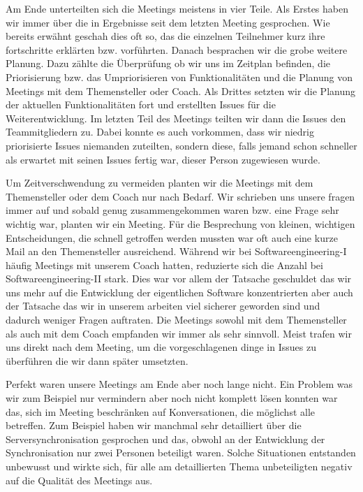 \documentclass[10pt]{article}
\begin{document}
Am Ende unterteilten sich die Meetings meistens in vier Teile. Als Erstes haben wir immer über die in Ergebnisse
seit dem letzten Meeting gesprochen. Wie bereits erwähnt geschah dies oft so, das die einzelnen Teilnehmer 
kurz ihre fortschritte erklärten bzw. vorführten.  Danach besprachen wir die grobe weitere Planung. Dazu zählte die 
Überprüfung ob wir uns im Zeitplan befinden, die Priorisierung bzw. das Umpriorisieren von Funktionalitäten und die 
Planung von Meetings mit dem Themensteller oder Coach. Als Drittes setzten wir die Planung der aktuellen Funktionalitäten 
fort und erstellten Issues für die Weiterentwicklung. Im letzten Teil des Meetings teilten wir dann die Issues 
den Teammitgliedern zu. Dabei konnte es auch vorkommen, dass wir niedrig priorisierte Issues niemanden zuteilten, sondern 
diese, falls jemand schon schneller als erwartet mit seinen Issues fertig war, dieser Person zugewiesen wurde.\par
\medskip
Um Zeitverschwendung zu vermeiden planten wir die Meetings mit dem Themensteller oder dem Coach nur nach Bedarf.
Wir schrieben uns unsere fragen immer auf und sobald genug zusammengekommen waren bzw. eine Frage sehr 
wichtig war, planten wir ein Meeting. Für die Besprechung von kleinen, wichtigen Entscheidungen,
die schnell getroffen werden mussten war oft auch eine kurze Mail an den Themensteller ausreichend.
Während wir bei Softwareengineering-I häufig Meetings mit unserem Coach hatten, reduzierte sich die Anzahl
bei Softwareengineering-II stark. Dies war vor allem der Tatsache geschuldet das wir uns mehr auf die Entwicklung
der eigentlichen Software konzentrierten aber auch der Tatsache das wir
in unserem arbeiten viel sicherer geworden sind und dadurch weniger Fragen auftraten.
Die Meetings sowohl mit dem Themensteller als auch mit dem Coach empfanden wir immer als sehr sinnvoll. Meist 
trafen wir uns direkt nach dem Meeting, um die vorgeschlagenen dinge in Issues zu überführen die wir dann später 
umsetzten.\par 
\medskip 
Perfekt waren unsere Meetings am Ende aber noch lange nicht. Ein Problem was wir zum Beispiel nur vermindern aber 
noch nicht komplett lösen konnten war das, sich im Meeting beschränken auf Konversationen, die möglichst alle betreffen.
Zum Beispiel haben wir manchmal sehr detailliert über die Serversynchronisation gesprochen und das, obwohl an der 
Entwicklung der Synchronisation nur zwei Personen beteiligt waren. Solche Situationen entstanden unbewusst und 
wirkte sich, für alle am detaillierten Thema unbeteiligten negativ auf die Qualität des Meetings aus.
\end{document}
